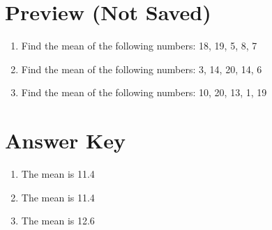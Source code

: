 \documentclass[12pt]{article}
\begin{document}
\section*{Preview (Not Saved)}

\begin{enumerate}[label=\textbf{\arabic*.}]
  \item Find the mean of the following numbers:
18, 19, 5, 8, 7
  \item Find the mean of the following numbers:
3, 14, 20, 14, 6
  \item Find the mean of the following numbers:
10, 20, 13, 1, 19
\end{enumerate}

\newpage
\section*{Answer Key}

\begin{enumerate}[label=\textbf{\arabic*.}]
  \item The mean is 11.4
  \item The mean is 11.4
  \item The mean is 12.6
\end{enumerate}
\end{document}

